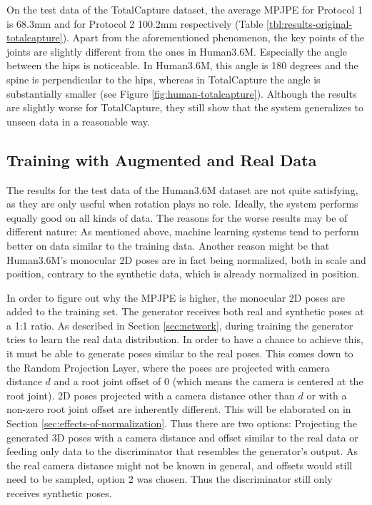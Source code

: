 On the test data of the TotalCapture dataset, the average MPJPE for Protocol 1 is 68.3mm and for Protocol 2 100.2mm respectively (Table \ref{tbl:results-original-totalcapture}).
Apart from the aforementioned phenomenon, the key points of the joints are slightly different from the ones in Human3.6M.
Especially the angle between the hips is noticeable.
In Human3.6M, this angle is 180 degrees and the spine is perpendicular to the hips, whereas in TotalCapture the angle is substantially smaller (see Figure \ref{fig:human-totalcapture}).
Although the results are slightly worse for TotalCapture, they still show that the system generalizes to unseen data in a reasonable way.




\subsection{Training with Augmented and Real Data}
The results for the test data of the Human3.6M dataset are not quite satisfying, as they are only useful when rotation plays no role.
Ideally, the system performs equally good on all kinds of data.
The reasons for the worse results may be of different nature:
As mentioned above, machine learning systems tend to perform better on data similar to the training data.
Another reason might be that Human3.6M's monocular 2D poses are in fact being normalized, both in scale and position, contrary to the synthetic data, which is already normalized in position.

In order to figure out why the MPJPE is higher, the monocular 2D poses are added to the training set.
The generator receives both real and synthetic poses at a 1:1 ratio.
As described in Section \ref{sec:network}, during training the generator tries to learn the real data distribution.
In order to have a chance to achieve this, it must be able to generate poses similar to the real poses. 
This comes down to the Random Projection Layer, where the poses are projected with camera distance $d$ and a root joint offset of $0$ (which means the camera is centered at the root joint).
2D poses projected with a camera distance other than $d$ or with a non-zero root joint offset are inherently different.
This will be elaborated on in Section \ref{sec:effects-of-normalization}.
Thus there are two options:
Projecting the generated 3D poses with a camera distance and offset similar to the real data or feeding only data to the discriminator that resembles the generator's output.
As the real camera distance might not be known in general, and offsets would still need to be sampled, option 2 was chosen.
Thus the discriminator still only receives synthetic poses.

